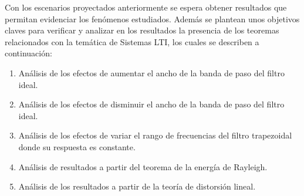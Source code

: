 Con los escenarios proyectados anteriormente se espera obtener resultados que permitan evidenciar los fenómenos estudiados. Además se plantean unos objetivos claves para verificar y analizar en los resultados la presencia de los teoremas relacionados con la temática de Sistemas LTI, los cuales se describen a continuación:

\begin{enumerate}
	\item Análisis de los efectos de aumentar el ancho de la banda de paso del filtro ideal.
	\item Análisis de los efectos de disminuir el ancho de la banda de paso del filtro ideal.
	\item Análisis de los efectos de variar el rango de frecuencias del filtro trapezoidal donde su respuesta es constante.
	\item Análisis de resultados a partir del teorema de la energía de Rayleigh.
	\item Análisis de los resultados a partir de la teoría de distorsión lineal.
\end{enumerate}
